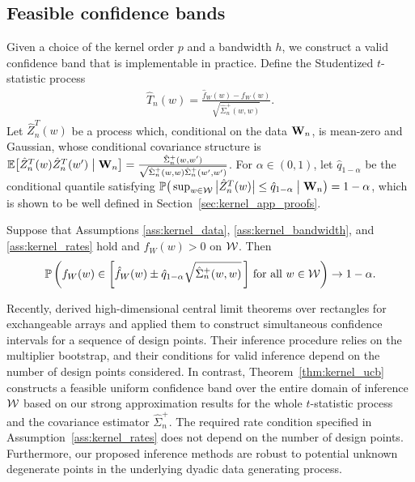 \subsection{Feasible confidence bands}
\label{sec:kernel_feasible_confidence_bands}

Given a choice of the kernel order $p$ and a bandwidth $h$, we construct a
valid confidence band that is implementable in practice. Define the Studentized
$t$-statistic process
%
\begin{align*}
  \hat T_n(w) = \frac{\hat{f}_W(w) - f_W(w)}{\sqrt{\hat \Sigma_n^+(w,w)}}.
\end{align*}
%
Let $\hat Z_n^T(w)$ be a process which, conditional on the data $\mathbf{W}_n$,
is mean-zero and Gaussian, whose conditional covariance structure is
$\mathbb{E}\big[ \hat Z_n^T(w) \hat Z_n^T(w') \bigm\vert \mathbf{W}_n \big]
= \frac{\hat \Sigma_n^+(w,w')}
{\sqrt{\hat \Sigma_n^+(w,w) \hat \Sigma_n^+(w',w')}}$.
For $\alpha \in (0,1)$, let $\hat q_{1-\alpha}$ be the
conditional quantile satisfying
$\mathbb{P}\big(\sup_{w \in \mathcal{W}} \big| \hat Z_n^T(w) \big| \leq \hat q_{1-\alpha}
\bigm\vert \mathbf{W}_n \big) = 1 - \alpha$,
which is shown to be well defined in Section~\ref{sec:kernel_app_proofs}.

\begin{theorem}
  \label{thm:kernel_ucb}

  Suppose that Assumptions \ref{ass:kernel_data}, \ref{ass:kernel_bandwidth},
  and \ref{ass:kernel_rates} hold and $f_W(w) > 0$ on $\mathcal{W}$. Then
  \begin{align*}
    \mathbb{P}\left(
      f_W(w) \in
      \left[ \hat f_W(w) \pm \hat q_{1-\alpha}
      \sqrt{\hat\Sigma_n^+(w,w)} \,\right]
      \,\textup{for all } w \in \mathcal{W}
    \right) \to 1 - \alpha.
  \end{align*}
\end{theorem}

Recently, \citet{chiang2022inference} derived high-dimensional central limit
theorems over rectangles for exchangeable arrays and applied them to construct
simultaneous confidence intervals for a sequence of design points. Their
inference procedure relies on the multiplier bootstrap, and their conditions
for valid inference depend on the number of design points considered. In
contrast, Theorem~\ref{thm:kernel_ucb} constructs a feasible uniform confidence
band over the entire domain of inference $\mathcal{W}$ based on our strong
approximation results for the whole $t$-statistic process and the covariance
estimator $\hat\Sigma_n^+$. The required rate condition specified in
Assumption~\ref{ass:kernel_rates} does not depend on the number of design
points.
Furthermore, our proposed inference methods are robust to potential unknown
degenerate points in the underlying dyadic data generating process.

